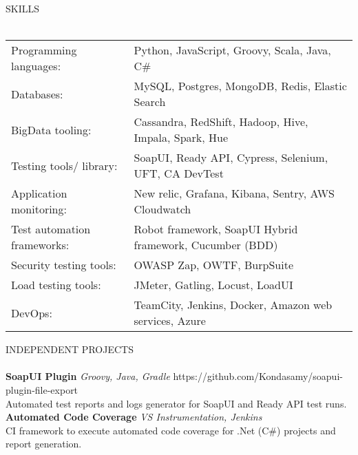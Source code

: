 \documentclass[a4paper]{article}
\newcommand{\lineunder} {
    \vspace*{-8pt} \\
    \hspace*{-18pt} \hrulefill \\
}
\newcommand{\header} [1] {
    {\hspace*{-18pt}\vspace*{6pt} \textsc{#1}}
    \vspace*{-6pt} \lineunder
}
\begin{document}
\header{SKILLS}
\begin{tabular}{ l l }
	Programming languages:      & Python, JavaScript, Groovy, Scala, Java, C\#                                            \\
	Databases:                  & MySQL, Postgres, MongoDB, Redis, Elastic Search         \\
	BigData tooling:                  & Cassandra, RedShift, Hadoop, Hive, Impala, Spark, Hue         \\
	Testing tools/ library:     & SoapUI, Ready API, Cypress, Selenium, UFT, CA DevTest             \\
	Application monitoring:     & New relic, Grafana, Kibana, Sentry, AWS Cloudwatch                \\
	Test automation frameworks: & Robot framework, SoapUI Hybrid framework, Cucumber (BDD)          \\
	Security testing tools:     & OWASP Zap, OWTF, BurpSuite                                        \\
	Load testing tools:         & JMeter, Gatling, Locust, LoadUI                                   \\
	DevOps:                     & TeamCity, Jenkins, Docker, Amazon web services, Azure \\
\end{tabular}
\vspace{2mm}

\header{INDEPENDENT PROJECTS}
{\textbf{SoapUI Plugin}} {\sl Groovy, Java, Gradle} \hfill https://github.com/Kondasamy/soapui-plugin-file-export\\
Automated test reports and logs generator for SoapUI and Ready API test runs.\\
\vspace*{2mm}
{\textbf{Automated Code Coverage}} {\sl VS Instrumentation, Jenkins} \\
CI framework to execute automated code coverage for .Net (C\#) projects and report generation.\\
\vspace*{2mm}
\end{document}
